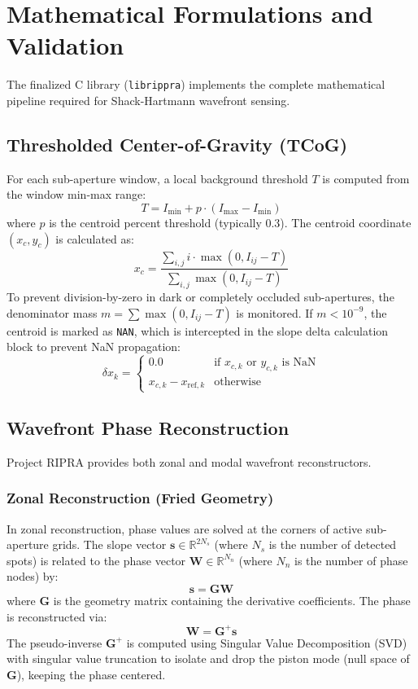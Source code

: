 \documentclass[10pt,journal,compsoc]{IEEEtran}
\begin{document}
\section{Mathematical Formulations and Validation}
\label{sec:math}
The finalized C library (\texttt{librippra}) implements the complete mathematical pipeline required for Shack-Hartmann wavefront sensing.

\subsection{Thresholded Center-of-Gravity (TCoG)}
For each sub-aperture window, a local background threshold $T$ is computed from the window min-max range:
\begin{equation}
T = I_{\min} + p \cdot (I_{\max} - I_{\min})
\end{equation}
where $p$ is the centroid percent threshold (typically 0.3). The centroid coordinate $(x_c, y_c)$ is calculated as:
\begin{equation}
x_c = \frac{\sum_{i,j} i \cdot \max(0, I_{ij} - T)}{\sum_{i,j} \max(0, I_{ij} - T)}
\end{equation}
To prevent division-by-zero in dark or completely occluded sub-apertures, the denominator mass $m = \sum \max(0, I_{ij} - T)$ is monitored. If $m < 10^{-9}$, the centroid is marked as \texttt{NAN}, which is intercepted in the slope delta calculation block to prevent NaN propagation:
\begin{equation}
\delta x_k = \begin{cases} 0.0 & \text{if } x_{c,k} \text{ or } y_{c,k} \text{ is NaN} \\ x_{c,k} - x_{\text{ref},k} & \text{otherwise} \end{cases}
\end{equation}

\subsection{Wavefront Phase Reconstruction}
Project RIPRA provides both zonal and modal wavefront reconstructors.

\subsubsection{Zonal Reconstruction (Fried Geometry)}
In zonal reconstruction, phase values are solved at the corners of active sub-aperture grids. The slope vector $\bm{s} \in \mathbb{R}^{2N_s}$ (where $N_s$ is the number of detected spots) is related to the phase vector $\bm{W} \in \mathbb{R}^{N_n}$ (where $N_n$ is the number of phase nodes) by:
\begin{equation}
\bm{s} = \bm{G} \bm{W}
\end{equation}
where $\bm{G}$ is the geometry matrix containing the derivative coefficients. The phase is reconstructed via:
\begin{equation}
\bm{W} = \bm{G}^{+} \bm{s}
\end{equation}
The pseudo-inverse $\bm{G}^{+}$ is computed using Singular Value Decomposition (SVD) with singular value truncation to isolate and drop the piston mode (null space of $\bm{G}$), keeping the phase centered.
\end{document}
